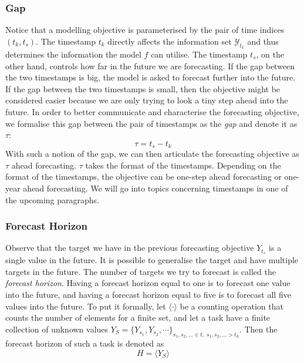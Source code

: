 \subsubsection{Gap}
Notice that a modelling objective is parameterised by the pair of time indices $(t_k, t_s)$. The timestamp $t_k$ directly affects the information set $\mathcal{Y}_{t_k}$ and thus determines the information the model $f$ can utilise. The timestamp $t_s$, on the other hand, controls how far in the future we are forecasting. If the gap between the two timestamps is big, the model is asked to forecast further into the future. If the gap between the two timestamps is small, then the objective might be considered easier because we are only trying to look a tiny step ahead into the future. In order to better communicate and characterise the forecasting objective, we formalise this gap between the pair of timestamps as the \textit{gap} and denote it as $\tau$:
\begin{equation*}
    \tau = t_s - t_k
\end{equation*}
With such a notion of the gap, we can then articulate the forecasting objective as $\tau$ ahead forecasting. $\tau$ takes the format of the timestamps. Depending on the format of the timestamps, the objective can be one-step ahead forecasting or one-year ahead forecasting. We will go into topics concerning timestamps in one of the upcoming paragraphs.

\subsubsection{Forecast Horizon}
Observe that the target we have in the previous forecasting objective $Y_{t_s}$ is a single value in the future. It is possible to generalise the target and have multiple targets in the future. The number of targets we try to forecast is called the \textit{forecast horizon}. Having a forecast horizon equal to one is to forecast one value into the future, and having a forecast horizon equal to five is to forecast all five values into the future. To put it formally, let $\langle \cdot \rangle$ be a counting operation that counts the number of elements for a finite set, and let a task have a finite collection of unknown values $Y_S = \{ Y_{s_1}, Y_{s_2}, \cdots \}_{s_1, s_2, \ldots \in t, \; s_1, s_2, \ldots > t_k}$. Then the forecast horizon of such a task is denoted as
\begin{equation*}
    H = \langle Y_S \rangle
\end{equation*}

